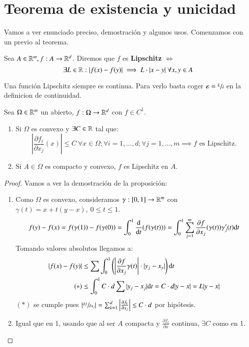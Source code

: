 \section{Teorema de existencia y unicidad}
Vamos a ver enunciado preciso, demostración y algunos usos. Comenzamos con un previo al teorema.\\
\begin{dfn}
    Sea $A \in \mathbb{R}^m, f: A \to \mathbb{R}^d$. Diremos que $f$ es \textbf{Lipschitz} $\iff$
    $$
        \exists L \in \mathbb{R} : |f(x) - f(y)| \implies L \cdot |x - y|\ \forall x,y \in A
    $$
\end{dfn}
\begin{obs}
    Una función Lipschitz siempre es continua. Para verlo basta coger $\varepsilon = \sfrac{L}{\delta}$ en la definicion de continuidad.
\end{obs}
\begin{pro}
    Sea $\Omega \in \mathbb{R}^m$ un abierto, $f:\Omega \to \mathbb{R}^d$ con $f \in C^1$.
    \begin{enumerate}
        \item Si $\Omega$ es convexo y $\exists C \in \mathbb{R}$ tal que:
        $$
            \left| \frac{\partial f_i}{\partial x_j} (x) \right| \leq C\ \forall x\in \Omega; \forall i = 1, \ldots, d; \forall j = 1, \ldots, m \implies f \text{ es Lipschitz.}
        $$
        \item Si $A \in \Omega$ es compacto y convexo, $f$ es Lipschitz en $A$.
    \end{enumerate}
\end{pro}
\begin{proof}
    Vamos a ver la demostración de la proposición:
    \begin{enumerate}
        \item
    Como $\Omega$ es convexo, consideramos $\gamma: [0,1] \to \mathbb{R}^m$ con $\gamma(t) = x + t(y-x),\ 0\leq t\leq 1$.
    $$
        f(y) - f(x) = f(\gamma(1)) - f(\gamma(0)) = \int_0^1 \frac{\mathrm{d}}{\mathrm{d}t} (f(\gamma(t))) = \int_0^1 \sum_{j=1}^m \frac{\partial f}{\partial x_j}(\gamma(t)) \gamma_j'(t) \mathrm{d} t
    $$
    Tomando valores absolutos llegamos a:
    \begin{align*}
        |f(x) - f(y)| &\leq \sum \int_0^1 \left(\left| \frac{\partial f}{\partial x_j} \gamma(t) \right| \cdot |y_j - x_y|\right) \mathrm{d} t\\
                     (*) & \leq \int_0^1 C\cdot d \sum |y_j - x_j| \mathrm{d} t =  C\cdot d |y -x| = L |y-x|
    \end{align*}
    $(*)$ se cumple pues $\left|\sfrac{\partial f}{\partial x_j}\right| = \sum_{k=1}^d \left| \frac{\partial f_k}{\partial x_j} \right| \leq C\cdot d$ por hipótesis.
    \item Igual que en 1, usando que al ser $A$ compacta y $\frac{\partial f_i}{\partial x}$ continua, $\exists C$ como en 1.
\end{enumerate}
\end{proof}
